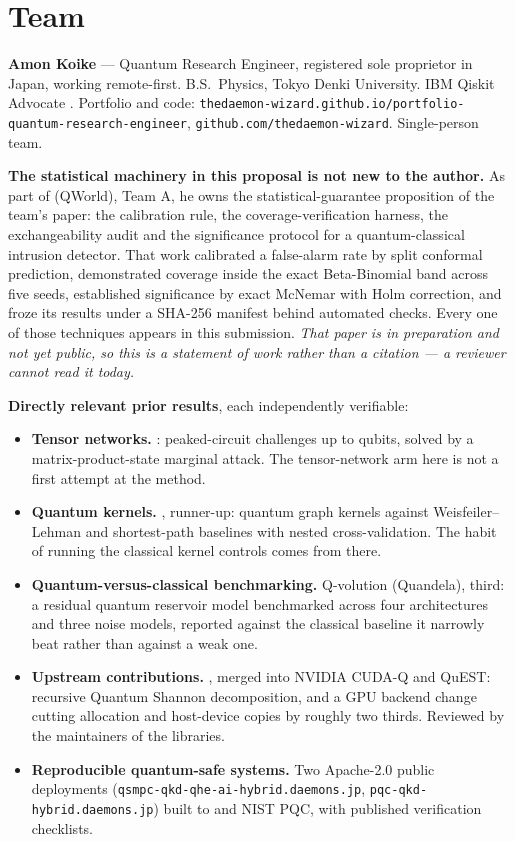 \section{Team}

\textbf{Amon Koike} --- Quantum Research Engineer, registered sole proprietor in Japan,
working remote-first. B.S.\ Physics, Tokyo Denki University. IBM Qiskit Advocate .
Portfolio and code: \texttt{thedaemon-wizard.github.io/portfolio-quantum-research-engineer},
\texttt{github.com/thedaemon-wizard}. Single-person team.

\textbf{The statistical machinery in this proposal is not new to the author.} As part of
 (QWorld), Team A, he owns the statistical-guarantee proposition of the
team's paper: the calibration rule, the coverage-verification harness, the exchangeability
audit and the significance protocol for a quantum-classical intrusion detector. That work
calibrated a false-alarm rate by split conformal prediction, demonstrated coverage inside the
exact Beta-Binomial band across five seeds, established significance by exact McNemar with
Holm correction, and froze its results under a SHA-256 manifest behind  automated checks.
Every one of those techniques appears in this submission. \emph{That paper is in preparation
and not yet public, so this is a statement of work rather than a citation --- a reviewer
cannot read it today.}

\textbf{Directly relevant prior results}, each independently verifiable:

\begin{itemize}
\item \textbf{Tensor networks.} : 
  peaked-circuit challenges up to  qubits, solved by a matrix-product-state marginal attack.
  The tensor-network arm here is not a first attempt at the method.
\item \textbf{Quantum kernels.} , runner-up: quantum graph kernels against
  Weisfeiler--Lehman and shortest-path baselines with nested cross-validation. The habit of
  running the classical kernel controls comes from there.
\item \textbf{Quantum-versus-classical benchmarking.} Q-volution (Quandela), third: a residual
  quantum reservoir model benchmarked across four architectures and three noise models,
  reported against the classical baseline it narrowly beat rather than against a weak one.
\item \textbf{Upstream contributions.} , merged into NVIDIA CUDA-Q and QuEST:
  recursive Quantum Shannon decomposition, and a GPU backend change cutting allocation and
  host-device copies by roughly two thirds. Reviewed by the maintainers of the libraries.
\item \textbf{Reproducible quantum-safe systems.} Two Apache-2.0 public deployments
  (\texttt{qsmpc-qkd-qhe-ai-hybrid.daemons.jp}, \texttt{pqc-qkd-hybrid.daemons.jp}) built to
   and NIST PQC, with published verification checklists.
\end{itemize}

